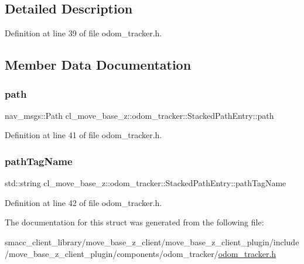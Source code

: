 \subsection{Detailed Description}


Definition at line 39 of file odom\+\_\+tracker.\+h.



\subsection{Member Data Documentation}
\mbox{\label{structcl__move__base__z_1_1odom__tracker_1_1StackedPathEntry_af117b7e2f89a07d3d1a4e0d74ed618ba}} 
\subsubsection{\texorpdfstring{path}{path}}
{\footnotesize\ttfamily nav\+\_\+msgs\+::\+Path cl\+\_\+move\+\_\+base\+\_\+z\+::odom\+\_\+tracker\+::\+Stacked\+Path\+Entry\+::path}



Definition at line 41 of file odom\+\_\+tracker.\+h.

\mbox{\label{structcl__move__base__z_1_1odom__tracker_1_1StackedPathEntry_a9b1ae67f1bb17e4a5a4b8c5c500df377}} 
\subsubsection{\texorpdfstring{path\+Tag\+Name}{pathTagName}}
{\footnotesize\ttfamily std\+::string cl\+\_\+move\+\_\+base\+\_\+z\+::odom\+\_\+tracker\+::\+Stacked\+Path\+Entry\+::path\+Tag\+Name}



Definition at line 42 of file odom\+\_\+tracker.\+h.



The documentation for this struct was generated from the following file\+:\begin{DoxyCompactItemize}
\item 
smacc\+\_\+client\+\_\+library/move\+\_\+base\+\_\+z\+\_\+client/move\+\_\+base\+\_\+z\+\_\+client\+\_\+plugin/include/move\+\_\+base\+\_\+z\+\_\+client\+\_\+plugin/components/odom\+\_\+tracker/\hyperlink{odom__tracker_8h}{odom\+\_\+tracker.\+h}\end{DoxyCompactItemize}
